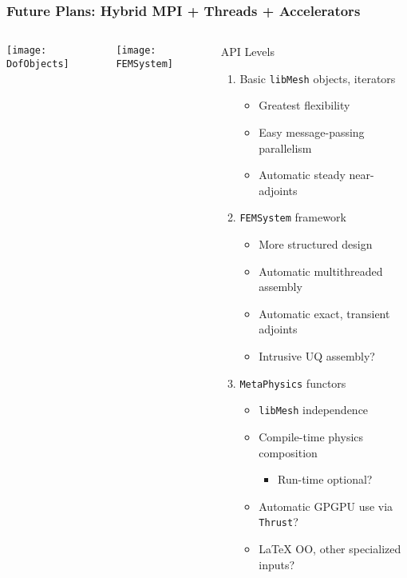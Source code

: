 \documentclass[mathserif]{beamer}
\newcommand{\software}[1]{\texttt{#1}}
\newcommand{\libMesh}{\software{libMesh}}
\begin{document}
\begin{frame}
\frametitle{Future Plans: Hybrid MPI + Threads + Accelerators}

\begin{columns}
\texttt{[image: DofObjects]}

\vspace{.1\textwidth}

\texttt{[image: FEMSystem]}

\begin{block}{API Levels}
\begin{enumerate}
	\item Basic \libMesh{} objects, iterators
	\begin{itemize}
		\item Greatest flexibility
		\item Easy message-passing parallelism
		\item Automatic steady near-adjoints
	\end{itemize}
	\item {\texttt{FEMSystem}} framework 
	\begin{itemize}
		\item More structured design
		\item Automatic multithreaded assembly
		\item Automatic exact, transient adjoints
		\item Intrusive UQ assembly?
	\end{itemize}
	\item {\texttt{MetaPhysics}} functors
	\begin{itemize}
		\item \libMesh{} independence
		\item Compile-time physics composition
		\begin{itemize}
			\item Run-time optional?
		\end{itemize}
		\item Automatic GPGPU use via \texttt{Thrust}?
		\item \LaTeX{} OO, other specialized inputs?
	\end{itemize}
\end{enumerate}
\end{block}
\end{columns}
\end{frame}
\end{document}
